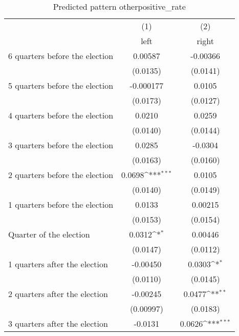 \begin{table}[htbp]\centering
\def\sym#1{\ifmmode^{#1}\else\(^{#1}\)\fi}
\caption{Predicted pattern otherpositive\_rate}
\begin{tabular}{l*{2}{c}}
\hline\hline
                    &\multicolumn{1}{c}{(1)}&\multicolumn{1}{c}{(2)}\\
                    &\multicolumn{1}{c}{left}&\multicolumn{1}{c}{right}\\
\hline
 6 quarters before the election&     0.00587         &    -0.00366         \\
                    &    (0.0135)         &    (0.0141)         \\
[1em]
 5 quarters before the election&   -0.000177         &      0.0105         \\
                    &    (0.0173)         &    (0.0127)         \\
[1em]
 4 quarters before the election&      0.0210         &      0.0259         \\
                    &    (0.0140)         &    (0.0144)         \\
[1em]
 3 quarters before the election&      0.0285         &     -0.0304         \\
                    &    (0.0163)         &    (0.0160)         \\
[1em]
 2 quarters before the election&      0.0698\sym{***}&      0.0105         \\
                    &    (0.0140)         &    (0.0149)         \\
[1em]
 1 quarters before the election&      0.0133         &     0.00215         \\
                    &    (0.0153)         &    (0.0154)         \\
[1em]
Quarter of the election&      0.0312\sym{*}  &     0.00446         \\
                    &    (0.0147)         &    (0.0112)         \\
[1em]
 1 quarters after the election&    -0.00450         &      0.0303\sym{*}  \\
                    &    (0.0110)         &    (0.0145)         \\
[1em]
 2 quarters after the election&    -0.00245         &      0.0477\sym{**} \\
                    &   (0.00997)         &    (0.0183)         \\
[1em]
 3 quarters after the election&     -0.0131         &      0.0626\sym{***}\\

\end{tabular}
\end{table}
